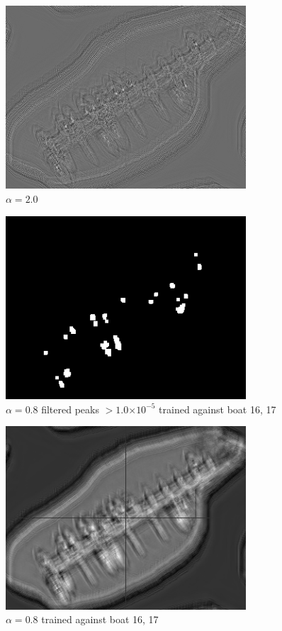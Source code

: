 \documentclass[12pt]{article}
\providecommand{\e}[1]{\ensuremath{\times 10^{#1}}}
\begin{document}
\begin{figure}
\centering
\includegraphics[width=0.80\textwidth]{v2/boats_a20.png}
\caption{\(\alpha=2.0\)}
\label{a20}
\end{figure}

\begin{figure}
\centering
\includegraphics[width=0.80\textwidth]{v2/boats_a08_missing_peak.png}
\caption{\(\alpha=0.8\) filtered peaks \(> 1.0\e{-5}\) trained against boat 16, 17}
\label{a07missingpeak}
\end{figure}

\begin{figure}
\centering
\includegraphics[width=0.80\textwidth]{v2/boats_a08_missing.png}
\caption{\(\alpha=0.8\) trained against boat 16, 17}
\label{a07missing}
\end{figure}
\end{document}
